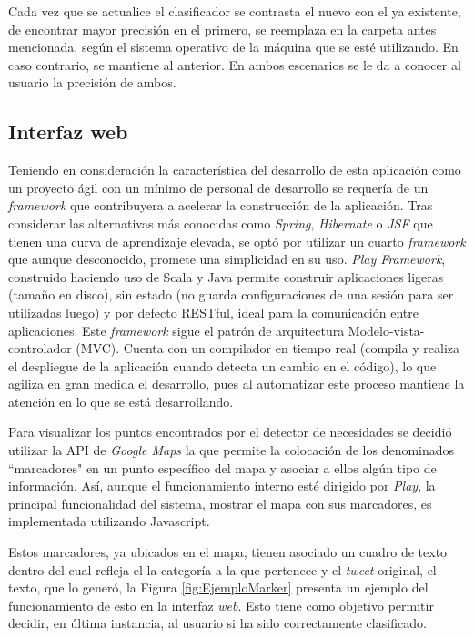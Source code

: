 Cada vez que se actualice el clasificador se contrasta el nuevo con el ya existente, de encontrar mayor precisión en el primero, se reemplaza en la carpeta antes mencionada, según el sistema operativo de la máquina que se esté utilizando. En caso contrario, se mantiene al anterior. En ambos escenarios se le da a conocer al usuario la precisión de ambos.

\subsection{Interfaz web}
\label{sec:diseno:interfaz}

Teniendo en consideración la característica del desarrollo de esta aplicación como un proyecto ágil con un mínimo de personal de desarrollo se requería de un \textit{framework} que contribuyera a acelerar la construcción de la aplicación. Tras considerar las alternativas más conocidas como \textit{Spring}, \textit{Hibernate} o \textit{JSF} que tienen una curva de aprendizaje elevada, se optó por utilizar un cuarto \textit{framework} que aunque desconocido, promete una simplicidad en su uso. \textit{Play Framework}, construido haciendo uso de Scala y Java permite construir aplicaciones ligeras (tamaño en disco), sin estado (no guarda configuraciones de una sesión para ser utilizadas luego) y por defecto RESTful, ideal para la comunicación entre aplicaciones. Este \textit{framework} sigue el patrón de arquitectura Modelo-vista-controlador (MVC). Cuenta con un compilador en tiempo real (compila y realiza el despliegue de la aplicación cuando detecta un cambio en el código), lo que agiliza en gran medida el desarrollo, pues al automatizar este proceso mantiene la atención en lo que se está desarrollando.

Para visualizar los puntos encontrados por el detector de necesidades se decidió utilizar la API de \textit{Google Maps} la que permite la colocación de los denominados ``marcadores" en un punto específico del mapa y asociar a ellos algún tipo de información. Así, aunque el funcionamiento interno esté dirigido por \textit{Play}, la principal funcionalidad del sistema, mostrar el mapa con sus marcadores, es implementada utilizando Javascript.

Estos marcadores, ya ubicados en el mapa, tienen asociado un cuadro de texto dentro del cual refleja el la categoría a la que pertenece y el \textit{tweet} original, el texto, que lo generó, la Figura \ref{fig:EjemploMarker} presenta un ejemplo del funcionamiento de esto en la interfaz \textit{web}. Esto tiene como objetivo permitir decidir, en última instancia, al usuario si ha sido correctamente clasificado.

